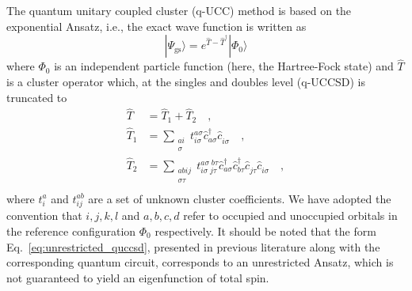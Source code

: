\documentclass[aps,pra,twocolumn]{revtex4-2}
\newcommand{\crt}[1]{\hat{c}_{#1}^\dagger}
\newcommand{\dst}[1]{\hat{c}_{#1}^{\phantom{\dagger}}}
\begin{document}
The quantum unitary coupled cluster (q-UCC) method is based on the exponential Ansatz, i.e., the exact wave function is written as
\begin{equation}
| \Psi_{\mathrm{gs}} \rangle = e^{ \hat{T} - \hat{T}^\dagger } | \Phi_0 \rangle
\end{equation}
where $\Phi_0$ is an independent particle function (here, the Hartree-Fock state) and $\hat{T}$ is a cluster operator which, 
at the singles and doubles level (q-UCCSD) is truncated to
\begin{equation}
\label{eq:unrestricted_quccsd}
\begin{split}
\hat{T} &= \hat{T}_1 + \hat{T}_2 \quad, \\
\hat{T}_1 &= \sum_{\substack{ai \\ \sigma}} t^{a \sigma}_{i \sigma} \crt{a \sigma} \dst{i \sigma} \quad,\\
\hat{T}_2 &= \sum_{\substack{abij \\ \sigma\tau}} t^{a\sigma \; b\tau}_{i\sigma \; j\tau} \crt{a \sigma} \crt{b \tau} \dst{j \tau} \dst{i \sigma} \quad,\\
\end{split}
\end{equation}
where $t^{a}_i$ and $t^{ab}_{ij}$ are a set of unknown cluster coefficients. We have adopted the convention that $i,j,k,l$ and $a,b,c,d$
refer to occupied and unoccupied orbitals in the reference configuration $\Phi_0$ respectively.
It should be noted that the form Eq.~\eqref{eq:unrestricted_quccsd}, presented in previous literature along with the corresponding quantum circuit,
corresponds to an unrestricted Ansatz, which is not guaranteed to yield an eigenfunction of total spin.
\end{document}
